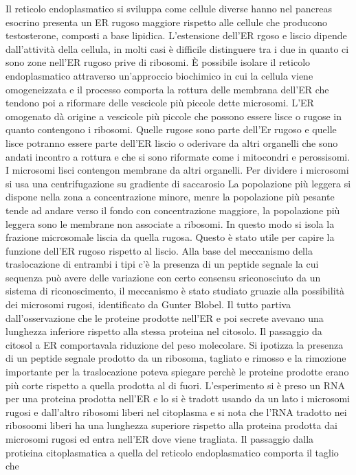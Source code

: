 Il reticolo endoplasmatico si sviluppa come cellule diverse hanno nel pancreas esocrino presenta un ER rugoso maggiore rispetto alle cellule che producono testosterone, composti a base
lipidica. L'estensione dell'ER rgoso e liscio dipende dall'attivit\`a della cellula, in molti casi \`e difficile distinguere tra i due in quanto ci sono zone nell'ER rugoso prive di 
ribosomi. \`E possibile isolare il reticolo endoplasmatico attraverso un'approccio biochimico in cui la cellula viene omogeneizzata e il processo comporta la rottura delle membrana 
dell'ER che tendono poi a riformare delle vescicole pi\`u piccole dette microsomi. L'ER omogenato d\`a origine a vescicole pi\`u piccole che possono essere lisce o rugose in quanto 
contengono i ribosomi. Quelle rugose sono parte dell'Er rugoso e quelle lisce potranno essere parte dell'ER liscio o oderivare da altri organelli che sono andati incontro a rottura e che 
si sono riformate come i mitocondri e perossisomi. I microsomi lisci contengon membrane da altri organelli. Per dividere i microsomi si usa una centrifugazione su gradiente di saccarosio
La popolazione pi\`u leggera si dispone nella zona a concentrazione minore, menre la popolazione pi\`u pesante tende ad andare verso il fondo con concentrazione maggiore, la popolazione
pi\`u leggera sono le membrane non associate a ribosomi. In questo modo si isola la frazione microsomale liscia da quella rugosa. Questo \`e stato utile per capire la funzione 
dell'ER rugoso rispetto al liscio. Alla base del meccanismo della traslocazione di entrambi i tipi c'\`e la presenza di un peptide segnale la cui sequenza pu\`o avere delle variazione
con certo consensu sriconosciuto da un sistema di riconoscimento, il meccanismo \`e stato studiato gruazie alla possibilit\`a dei microsomi rugosi, identificato da Gunter Blobel. Il
tutto partiva dall'osservazione che le proteine prodotte nell'ER e poi secrete avevano una lunghezza inferiore rispetto alla stessa proteina nel citosolo. Il passaggio da citosol a ER
comportavala riduzione del peso molecolare. Si ipotizza la presenza di un peptide segnale prodotto da un ribosoma, tagliato e rimosso e la rimozione importante per la traslocazione 
poteva spiegare perch\`e le proteine prodotte erano pi\`u corte rispetto a quella prodotta al di fuori. L'esperimento si \`e preso un RNA per una proteina prodotta nell'ER e lo si \`e
tradott usando da un lato i microsomi rugosi e dall'altro ribosomi liberi nel citoplasma e si nota che l'RNA tradotto nei ribosoomi liberi ha una lunghezza superiore rispetto alla 
proteina prodotta dai microsomi rugosi ed entra nell'ER dove viene tragliata. Il passaggio dalla protieina citoplasmatica a quella del reticolo endoplasmatico comporta il taglio che 
